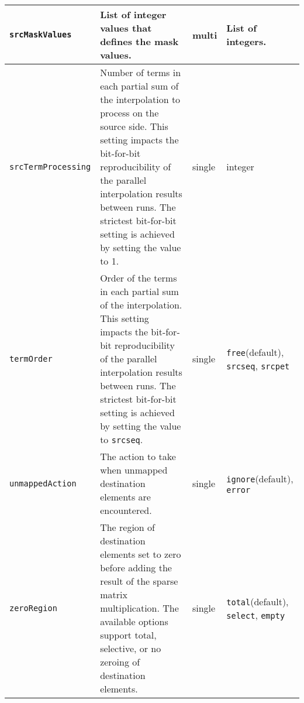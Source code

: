 \begin{longtable}{|p{5cm}|p{5cm}|p{1cm}|p{35mm}|}
     {\tt srcMaskValues} & List of integer values that defines the mask values. & multi & List of integers.\\ \hline
     {\tt srcTermProcessing} & Number of terms in each partial sum of the interpolation to process on the source side. This setting impacts the bit-for-bit reproducibility of the parallel interpolation results between runs. The strictest bit-for-bit setting is achieved by setting the value to 1. & single & integer\\ \hline
     {\tt termOrder} & Order of the terms in each partial sum of the interpolation. This setting impacts the bit-for-bit reproducibility of the parallel interpolation results between runs. The strictest bit-for-bit setting is achieved by setting the value to {\tt srcseq}. & single & {\tt free}(default), {\tt srcseq}, {\tt srcpet}\\ \hline
     {\tt unmappedAction} & The action to take when unmapped destination elements are encountered. & single & {\tt ignore}(default), {\tt error}\\ \hline
     {\tt zeroRegion} & The region of destination elements set to zero before adding the result of the sparse matrix multiplication. The available options support total, selective, or no zeroing of destination elements. & single & {\tt total}(default), {\tt select}, {\tt empty}\\ \hline
     \hline
\end{longtable}

